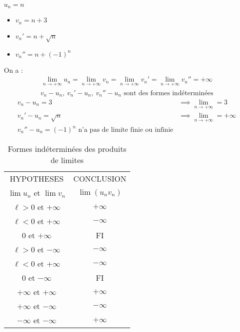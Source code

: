 \begin{exemple}
$u_n = n$
\begin{itemize}
    \item $v_n = n + 3$ 
    \item $v_n' = n + \sqrt{n}$
    \item $v_n'' = n + (-1)^{n}$
\end{itemize}
On a :
\begin{align*}
    \lim_{n \to +\infty} u_n = \lim_{n \to +\infty} v_n = \lim_{n \to +\infty} v_n' = \lim_{n \to +\infty} v_n'' = +\infty
\end{align*}
\begin{align*}
    v_n - u_n, \ v_n' - u_n, \ v_n'' - u_n \text{ sont des formes indéterminées}
\end{align*}
\begin{align*}
    v_n - u_n = 3 &\implies \lim_{n \to +\infty} = 3 \\
    v_n' - u_n = \sqrt{n} &\implies \lim_{n \to +\infty} = +\infty \\
    v_n'' -u_n = (-1)^n \text{ n'a pas de limite finie ou infinie}
\end{align*}
\end{exemple}

\begin{remarque}
    \begin{table}[!h]
        \centering
        \begin{tabular}{c c}
            HYPOTHESES & CONCLUSION \\
            $\lim u_n$ et $\lim v_n$ & $\lim (u_n v_n)$ \\
            $\ell > 0$ et $+\infty$ & $+\infty$ \\
            $\ell < 0$ et $+\infty$ & $-\infty$ \\
            $0$ et $+\infty$ & FI \\
            $\ell > 0$ et $-\infty$ & $-\infty$ \\
            $\ell < 0$ et $+\infty$ & $-\infty$ \\
            $0$ et $-\infty$ & FI \\
            $+\infty$ et $+\infty$ & $+\infty$ \\
            $+\infty$ et $-\infty$ & $-\infty$ \\
            $-\infty$ et $-\infty$ & $+\infty$
        \end{tabular}
        \caption{Formes indéterminées des produits de limites}
    \end{table}
\end{remarque}

